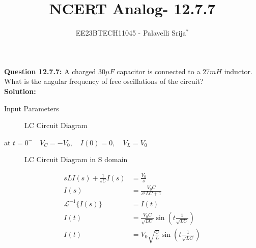 \documentclass[journal,12pt,twocolumn]{IEEEtran}
\theoremstyle{remark}
\begin{document}

\vspace{3cm}

\title{NCERT Analog- 12.7.7}
\author{EE23BTECH11045 - Palavelli Srija$^{*}$}

\maketitle

\bigskip

\renewcommand{\thefigure}{\theenumi}
\renewcommand{\thetable}{\theenumi}

\vspace{3cm}
\textbf{Question 12.7.7:} 
 A charged $30 \mu F$ capacitor is connected to a $27 mH$ inductor. What is the angular frequency of free oscillations of the circuit?\\
\textbf{Solution: }
\begin{table}[h!]
    \centering
    
    \caption{Input Parameters}
    \label{tab:table_omega}
\end{table}
\begin{figure}[H]
    \centering
    
    \caption{LC Circuit Diagram}
    \label{fig:sr33}
\end{figure}
at $t=0^-\quad V_C=-V_0,\quad I(0)=0,\quad V_L=V_0$\\

\begin{figure}[H]
    \centering
    
   \caption{LC Circuit Diagram in S domain}
    \label{fig:sr32}
\end{figure}
\begin{align}
sL I(s) + \frac{1}{sC} I(s) &= \frac{V_0}{s} \\
I(s) &= \frac{V_0C}{s^2LC + 1} \\
\mathcal{L}^{-1}\{I(s)\} &= I(t) \\
I(t) &= \frac{V_0C}{\sqrt{LC}} \sin\left(t\frac{1}{\sqrt{LC}}\right) \\
I(t) &= V_0\sqrt{\frac{C}{L}} \sin\left(t\frac{1}{\sqrt{LC}}\right)
\end{align}
\end{document}
